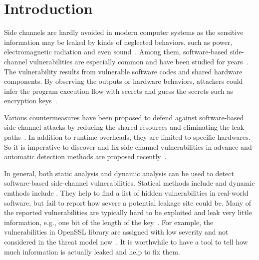 \section{Introduction}
Side channels are hardly avoided in modern computer systems as the sensitive information 
may be leaked by kinds of neglected behaviors, 
such as power, electromagnetic radiation and even sound~\cite{}. 
Among them, software-based side-channel vulnerabilities are especially common and have been studied for years~\cite{}. 
The vulnerability results from vulnerable software codes and shared hardware components.
By observing the outputs or hardware behaviors, attackers could 
infer the program execution flow with secrets and guess the secrets such as encryption keys~\cite{}.

Various countermeasures have been proposed to defend against 
software-based side-channel attacks by reducing the shared resources
and eliminating the leak paths~\cite{182946,203878,217537}. 
In addition to runtime overheads, they are limited to specific hardwares. 
So it is imperative to discover and fix side channel vulnerabilities in advance 
and automatic detection methods are proposed recently~\cite{}.

In general, both static analysis and dynamic analysis
can be used to detect software-based side-channel vulnerabilities.
Statical methods include  and dynamic emthods include .
They help to find a list of hidden vulnerabilities in real-world software, 
but fail to report how severe a potential leakage site could be. 
Many of the reported vulnerabilities are typically hard to be exploited 
and leak very little information, e.g., one bit of the length of the key~\cite{203878}.  
For example, the vulnerabilities in OpenSSL library are assigned with low severity and not considered 
in the threat model now~\cite{https://www.openssl.org/policies/secpolicy.html}. 
It is worthwhile to have a tool to tell how much information is actually leaked and help to fix them.

